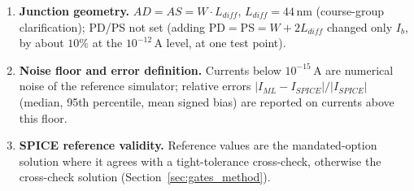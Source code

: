 \begin{enumerate}[nosep]
  \item \textbf{Junction geometry.} $AD=AS=W\cdot L_{diff}$, $L_{diff}=44\,\mathrm{nm}$ (course-group clarification); PD/PS not set (adding PD$=$PS$=W+2L_{diff}$ changed only $I_b$, by about $10\%$ at the $10^{-12}$\,A level, at one test point).
  \item \textbf{Noise floor and error definition.} Currents below $10^{-15}$\,A are numerical noise of the reference simulator; relative errors $|I_{ML}-I_{SPICE}|/|I_{SPICE}|$ (median, 95th percentile, mean signed bias) are reported on currents above this floor.
  \item \textbf{SPICE reference validity.} Reference values are the mandated-option solution where it agrees with a tight-tolerance cross-check, otherwise the cross-check solution (Section~\ref{sec:gates_method}).
\end{enumerate}
